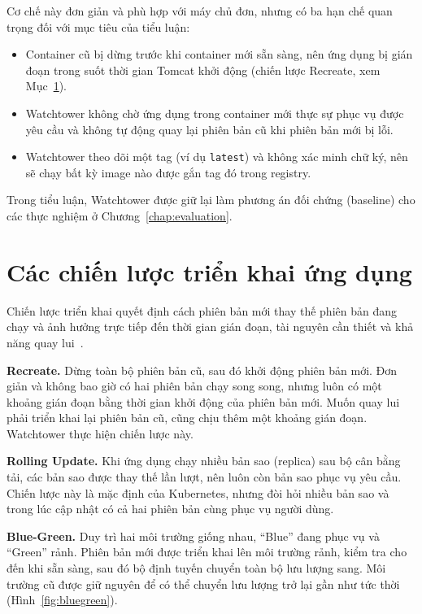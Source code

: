 \documentclass[12pt,a4paper,oneside]{extreport}
\begin{document}
Cơ chế này đơn giản và phù hợp với máy chủ đơn, nhưng có ba hạn chế quan trọng
đối với mục tiêu của tiểu luận:
\begin{itemize}
  \item Container cũ bị dừng trước khi container mới sẵn sàng, nên ứng dụng bị
  gián đoạn trong suốt thời gian Tomcat khởi động (chiến lược Recreate, xem
  Mục~\ref{sec:deploy-strategies}).
  \item Watchtower không chờ ứng dụng trong container mới thực sự phục vụ được
  yêu cầu và không tự động quay lại phiên bản cũ khi phiên bản mới bị lỗi.
  \item Watchtower theo dõi một tag (ví dụ \texttt{latest}) và không xác minh chữ
  ký, nên sẽ chạy bất kỳ image nào được gắn tag đó trong registry.
\end{itemize}
Trong tiểu luận, Watchtower được giữ lại làm phương án đối chứng (baseline) cho
các thực nghiệm ở Chương~\ref{chap:evaluation}.

\section{Các chiến lược triển khai ứng dụng}
\label{sec:deploy-strategies}
Chiến lược triển khai quyết định cách phiên bản mới thay thế phiên bản đang chạy
và ảnh hưởng trực tiếp đến thời gian gián đoạn, tài nguyên cần thiết và khả năng
quay lui~\cite{humble2010}.

\textbf{Recreate.} Dừng toàn bộ phiên bản cũ, sau đó khởi động phiên bản mới.
Đơn giản và không bao giờ có hai phiên bản chạy song song, nhưng luôn có một
khoảng gián đoạn bằng thời gian khởi động của phiên bản mới. Muốn quay lui phải
triển khai lại phiên bản cũ, cũng chịu thêm một khoảng gián đoạn. Watchtower
thực hiện chiến lược này.

\textbf{Rolling Update.} Khi ứng dụng chạy nhiều bản sao (replica) sau bộ cân
bằng tải, các bản sao được thay thế lần lượt, nên luôn còn bản sao phục vụ yêu
cầu. Chiến lược này là mặc định của Kubernetes, nhưng đòi hỏi nhiều bản sao và
trong lúc cập nhật có cả hai phiên bản cùng phục vụ người dùng.

\textbf{Blue-Green.} Duy trì hai môi trường giống nhau, ``Blue'' đang phục vụ và
``Green'' rảnh. Phiên bản mới được triển khai lên môi trường rảnh, kiểm tra cho
đến khi sẵn sàng, sau đó bộ định tuyến chuyển toàn bộ lưu lượng sang. Môi trường
cũ được giữ nguyên để có thể chuyển lưu lượng trở lại gần như tức
thời~\cite{fowler-bluegreen} (Hình~\ref{fig:bluegreen}).
\end{document}
